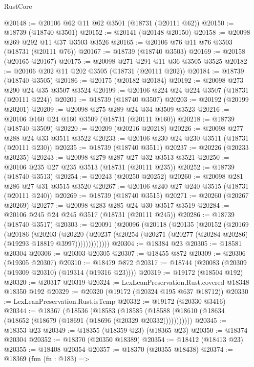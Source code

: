\begin{lexlean}{RustCore}
\begin{coremodule}
@20148 := @20106 @62 @11 @62 @3501 (@18731 (@20111 @62))
@20150 := @18739 (@18740 @3501)
@20152 := @20141 (@20148 @20150)
@20158 := @20098 @269 @292 @11 @37 @3503 @3526
@20165 := @20106 @76 @11 @76 @3503 (@18731 (@20111 @76))
@20167 := @18739 (@18740 @3503)
@20169 := @20158 (@20165 @20167)
@20175 := @20098 @271 @291 @11 @36 @3505 @3525
@20182 := @20106 @202 @11 @202 @3505 (@18731 (@20111 @202))
@20184 := @18739 (@18740 @3505)
@20186 := @20175 (@20182 @20184)
@20192 := @20098 @273 @290 @24 @35 @3507 @3524
@20199 := @20106 @224 @24 @224 @3507 (@18731 (@20111 @224))
@20201 := @18739 (@18740 @3507)
@20203 := @20192 (@20199 @20201)
@20209 := @20098 @275 @289 @24 @34 @3509 @3523
@20216 := @20106 @160 @24 @160 @3509 (@18731 (@20111 @160))
@20218 := @18739 (@18740 @3509)
@20220 := @20209 (@20216 @20218)
@20226 := @20098 @277 @288 @24 @33 @3511 @3522
@20233 := @20106 @230 @24 @230 @3511 (@18731 (@20111 @230))
@20235 := @18739 (@18740 @3511)
@20237 := @20226 (@20233 @20235)
@20243 := @20098 @279 @287 @27 @32 @3513 @3521
@20250 := @20106 @235 @27 @235 @3513 (@18731 (@20111 @235))
@20252 := @18739 (@18740 @3513)
@20254 := @20243 (@20250 @20252)
@20260 := @20098 @281 @286 @27 @31 @3515 @3520
@20267 := @20106 @240 @27 @240 @3515 (@18731 (@20111 @240))
@20269 := @18739 (@18740 @3515)
@20271 := @20260 (@20267 @20269)
@20277 := @20098 @283 @285 @24 @30 @3517 @3519
@20284 := @20106 @245 @24 @245 @3517 (@18731 (@20111 @245))
@20286 := @18739 (@18740 @3517)
@20303 := @20091
    (@20096
      (@20118
        (@20135
          (@20152
            (@20169
              (@20186
                (@20203
                  (@20220
                    (@20237
                      (@20254 (@20271 (@20277 (@20284 @20286) (@19293 @18819 @3997)))))))))))))
@20304 := @18384 @23
@20305 := @18581 @20304
@20306 := @20303 @20305
@20307 := @18455 @872
@20309 := @20306 (@19305 @20307)
@20310 := @18479 @872
@20317 := @18744 (@20083 (@20309 (@19309 @20310) (@19314 (@19316 @23))))
@20319 := @19172 (@18504 @192)
@20320 := @20317 @20319
@20324 := LexLeanPreservation.Rust.covered @18348 @18350 @192
@20329 := @20320 (@19172 (@20324 @195 @637 @18712))
@20330 := LexLeanPreservation.Rust.isTemp
@20332 := @19172 (@20330 @3416)
@20344 := @18367
    (@18536
      (@18583
        (@18585 (@18588 (@18610 (@18634 (@18652 (@18679 (@18691 (@18696 (@20329 @20332)))))))))))
@20345 := @18353 @23
@20349 := @18355 (@18359 @23) (@18365 @23)
@20350 := @18374 @20304
@20352 := @18370 (@20350 @18389)
@20354 := @18412 (@18413 @23)
@20355 := @18408 @20354
@20357 := @18370 (@20355 @18438)
@20374 := @18369
    (fun (fn : @183) =>

\end{coremodule}
\end{lexlean}

